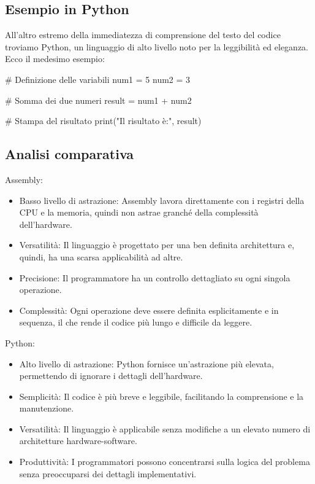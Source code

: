\documentclass[
  letterpaper,
  DIV=11,
  numbers=noendperiod]{scrreprt}
\newenvironment{Shaded}{\begin{snugshade}}{\end{snugshade}}
\newcommand{\BuiltInTok}[1]{\textcolor[rgb]{0.00,0.23,0.31}{#1}}
\newcommand{\CommentTok}[1]{\textcolor[rgb]{0.37,0.37,0.37}{#1}}
\newcommand{\DecValTok}[1]{\textcolor[rgb]{0.68,0.00,0.00}{#1}}
\newcommand{\NormalTok}[1]{\textcolor[rgb]{0.00,0.23,0.31}{#1}}
\newcommand{\OperatorTok}[1]{\textcolor[rgb]{0.37,0.37,0.37}{#1}}
\newcommand{\StringTok}[1]{\textcolor[rgb]{0.13,0.47,0.30}{#1}}
\providecommand{\tightlist}{%
  \setlength{\itemsep}{0pt}\setlength{\parskip}{0pt}}\usepackage{longtable,booktabs,array}
\begin{document}
\subsection{Esempio in Python}\label{esempio-in-python}

All'altro estremo della immediatezza di comprensione del testo del
codice troviamo Python, un linguaggio di alto livello noto per la
leggibilità ed eleganza. Ecco il medesimo esempio:

\begin{Shaded}
\begin{Highlighting}[]
\CommentTok{\# Definizione delle variabili}
\NormalTok{num1 }\OperatorTok{=} \DecValTok{5}
\NormalTok{num2 }\OperatorTok{=} \DecValTok{3}

\CommentTok{\# Somma dei due numeri}
\NormalTok{result }\OperatorTok{=}\NormalTok{ num1 }\OperatorTok{+}\NormalTok{ num2}

\CommentTok{\# Stampa del risultato}
\BuiltInTok{print}\NormalTok{(}\StringTok{"Il risultato è:"}\NormalTok{, result)}
\end{Highlighting}
\end{Shaded}

\subsection{Analisi comparativa}\label{analisi-comparativa}

Assembly:

\begin{itemize}
\tightlist
\item
  Basso livello di astrazione: Assembly lavora direttamente con i
  registri della CPU e la memoria, quindi non astrae granché della
  complessità dell'hardware.
\item
  Versatilità: Il linguaggio è progettato per una ben definita
  architettura e, quindi, ha una scarsa applicabilità ad altre.
\item
  Precisione: Il programmatore ha un controllo dettagliato su ogni
  singola operazione.
\item
  Complessità: Ogni operazione deve essere definita esplicitamente e in
  sequenza, il che rende il codice più lungo e difficile da leggere.
\end{itemize}

Python:

\begin{itemize}
\tightlist
\item
  Alto livello di astrazione: Python fornisce un'astrazione più elevata,
  permettendo di ignorare i dettagli dell'hardware.
\item
  Semplicità: Il codice è più breve e leggibile, facilitando la
  comprensione e la manutenzione.
\item
  Versatilità: Il linguaggio è applicabile senza modifiche a un elevato
  numero di architetture hardware-software.
\item
  Produttività: I programmatori possono concentrarsi sulla logica del
  problema senza preoccuparsi dei dettagli implementativi.
\end{itemize}
\end{document}
